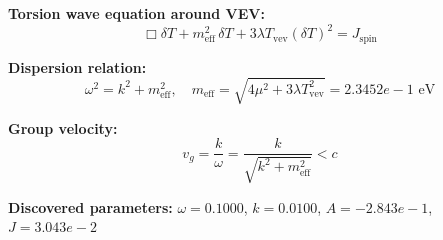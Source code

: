 
\textbf{Torsion wave equation around VEV:}
\begin{equation}
  \Box \delta T + m_{\text{eff}}^2 \, \delta T + 3\lambda T_{\text{vev}} (\delta T)^2 = J_{\text{spin}}
\end{equation}

\textbf{Dispersion relation:}
\begin{equation}
  \omega^2 = k^2 + m_{\text{eff}}^2, \quad
  m_{\text{eff}} = \sqrt{4\mu^2 + 3\lambda T_{\text{vev}}^2} = 2.3452e-1 \text{ eV}
\end{equation}

\textbf{Group velocity:}
\begin{equation}
  v_g = \frac{k}{\omega} = \frac{k}{\sqrt{k^2 + m_{\text{eff}}^2}} < c
\end{equation}

\textbf{Discovered parameters:}
$\omega = 0.1000$, \quad
$k = 0.0100$, \quad
$A = -2.843e-1$, \quad
$J = 3.043e-2$